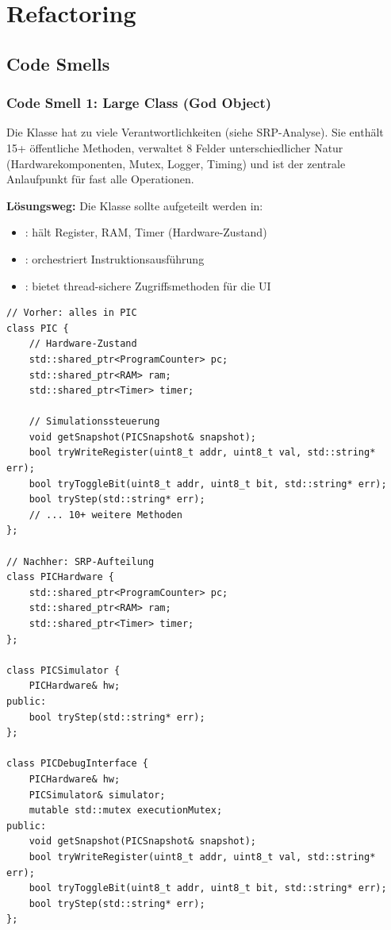 \chapter{Refactoring}

\section{Code Smells}

\subsection{Code Smell 1: Large Class (God Object)}

Die Klasse  hat zu viele Verantwortlichkeiten (siehe SRP-Analyse). Sie enthält 15+ öffentliche Methoden, verwaltet 8 Felder unterschiedlicher Natur (Hardwarekomponenten, Mutex, Logger, Timing) und ist der zentrale Anlaufpunkt für fast alle Operationen.

\textbf{Lösungsweg:} Die Klasse sollte aufgeteilt werden in:

\begin{itemize}
    \item {}: hält Register, RAM, Timer (Hardware-Zustand)
    \item {}: orchestriert Instruktionsausführung
    \item {}: bietet thread-sichere Zugriffsmethoden für die UI
\end{itemize}

\begin{lstlisting}[style=codeblock,language=picassocpp]
// Vorher: alles in PIC
class PIC {
    // Hardware-Zustand
    std::shared_ptr<ProgramCounter> pc;
    std::shared_ptr<RAM> ram;
    std::shared_ptr<Timer> timer;

    // Simulationssteuerung
    void getSnapshot(PICSnapshot& snapshot);
    bool tryWriteRegister(uint8_t addr, uint8_t val, std::string* err);
    bool tryToggleBit(uint8_t addr, uint8_t bit, std::string* err);
    bool tryStep(std::string* err);
    // ... 10+ weitere Methoden
};

// Nachher: SRP-Aufteilung
class PICHardware {
    std::shared_ptr<ProgramCounter> pc;
    std::shared_ptr<RAM> ram;
    std::shared_ptr<Timer> timer;
};

class PICSimulator {
    PICHardware& hw;
public:
    bool tryStep(std::string* err);
};

class PICDebugInterface {
    PICHardware& hw;
    PICSimulator& simulator;
    mutable std::mutex executionMutex;
public:
    void getSnapshot(PICSnapshot& snapshot);
    bool tryWriteRegister(uint8_t addr, uint8_t val, std::string* err);
    bool tryToggleBit(uint8_t addr, uint8_t bit, std::string* err);
    bool tryStep(std::string* err);
};
\end{lstlisting}

